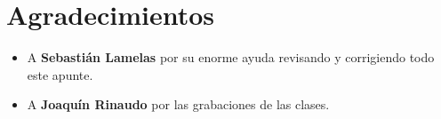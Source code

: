 \documentclass[]{article}
\begin{document}
\newpage

\section{Agradecimientos}
\begin{itemize}
	\item A \textbf{Sebastián Lamelas} por su enorme ayuda revisando y corrigiendo todo este apunte.
	\item A \textbf{Joaquín Rinaudo} por las grabaciones de las clases.
\end{itemize}
\end{document}
